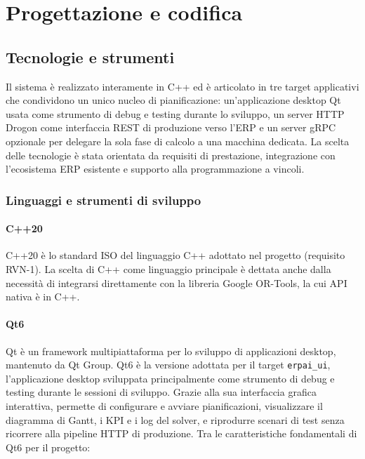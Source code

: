 \chapter{Progettazione e codifica}
\label{chap:progettazione-codifica}

\section{Tecnologie e strumenti}
\label{sec:tecnologie-strumenti}

Il sistema è realizzato interamente in C++ ed è articolato in tre target applicativi che condividono un unico nucleo di pianificazione: un'applicazione desktop Qt usata come strumento di debug e testing durante lo sviluppo, un server HTTP Drogon come interfaccia REST di produzione verso l'ERP e un server gRPC opzionale per delegare la sola fase di calcolo a una macchina dedicata. La scelta delle tecnologie è stata orientata da requisiti di prestazione, integrazione con l'ecosistema ERP esistente e supporto alla programmazione a vincoli.

\subsection{Linguaggi e strumenti di sviluppo}
\label{subsec:linguaggi}

\subsubsection{C++20}

C++20 è lo standard ISO del linguaggio C++ adottato nel progetto (requisito RVN-1). La scelta di C++ come linguaggio principale è dettata anche dalla necessità di integrarsi direttamente con la libreria Google OR-Tools, la cui API nativa è in C++.

\subsubsection{Qt6}

Qt è un framework multipiattaforma per lo sviluppo di applicazioni desktop, mantenuto da Qt Group. Qt6 è la versione adottata per il target \texttt{erpai\_ui}, l'applicazione desktop sviluppata principalmente come strumento di debug e testing durante le sessioni di sviluppo. Grazie alla sua interfaccia grafica interattiva, permette di configurare e avviare pianificazioni, visualizzare il diagramma di Gantt, i KPI e i log del solver, e riprodurre scenari di test senza ricorrere alla pipeline HTTP di produzione. Tra le caratteristiche fondamentali di Qt6 per il progetto:


